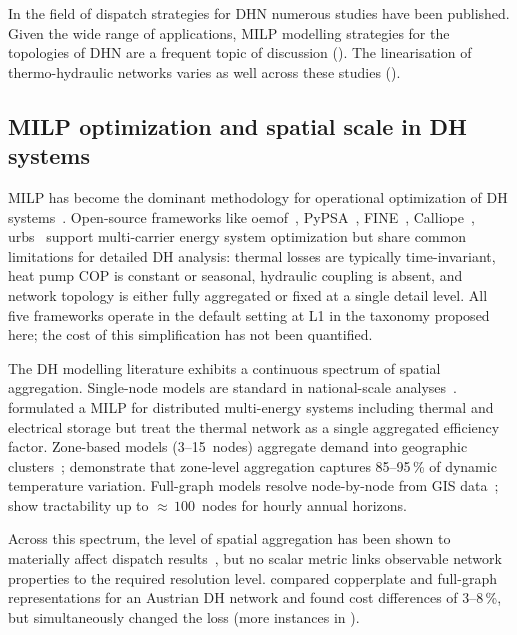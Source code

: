 \documentclass[a4paper,fleqn]{cas-dc}
\begin{document}
In the field of dispatch strategies for DHN numerous studies have been published. Given the wide range of applications, MILP modelling strategies for the topologies of DHN are a frequent topic of discussion (). The linearisation of thermo-hydraulic networks varies as well across these studies ().

\subsection{MILP optimization and spatial scale in DH systems}
\label{sec:rw_milp_topo}

MILP has become the dominant methodology for operational
optimization of DH systems~\citep{Fang2016,Guelpa2019review}.
Open-source frameworks like oemof~\citep{Hilpert2018_oemof},
PyPSA~\citep{Brown2018_pypsa}, FINE~\citep{Welder2018_FINE},
Calliope~\citep{Pfenninger2018_calliope},
urbs~\citep{Dorfner2016_urbs} support multi-carrier energy
system optimization but share common limitations for detailed DH
analysis: thermal losses are typically time-invariant, heat pump
COP is constant or seasonal, hydraulic coupling is absent, and
network topology is either fully aggregated or fixed at a single
detail level. All five frameworks operate in the default setting at L1 in the taxonomy proposed here; the cost of this simplification has not been
quantified.

The DH modelling literature exhibits a continuous spectrum of
spatial aggregation. Single-node models are standard in
national-scale analyses~\citep{Connolly2014_EnergyPLAN,
Brown2018_pypsa,Lund2017_SmartEnergy}.
\citet{Gabrielli2018} formulated a MILP for distributed
multi-energy systems including thermal and electrical storage but
treat the thermal network as a single aggregated efficiency
factor. Zone-based models (3--15~nodes) aggregate demand into
geographic clusters~\citep{Wirtz2020,Mertz2016,Buffa2019};
\citet{Buenning2020} demonstrate that zone-level aggregation
captures 85--95\,\% of dynamic temperature variation. Full-graph
models resolve node-by-node from GIS
data~\citep{Vesterlund2017,Schweiger2017,vanderHeijde2017,
Blommaert2020}; \citet{Giraud2015} show tractability up to
${\approx}\,100$~nodes for hourly annual horizons.

Across this spectrum, the level of spatial aggregation has been
shown to materially affect dispatch
results~\citep{Wirtz2020,Buffa2019}, but no scalar metric links
observable network properties to the required resolution level.
\citet{Leitner2019} compared copperplate and full-graph
representations for an Austrian DH network and found cost
differences of 3--8\,\%, but simultaneously changed the loss (more instances in ).
\end{document}
